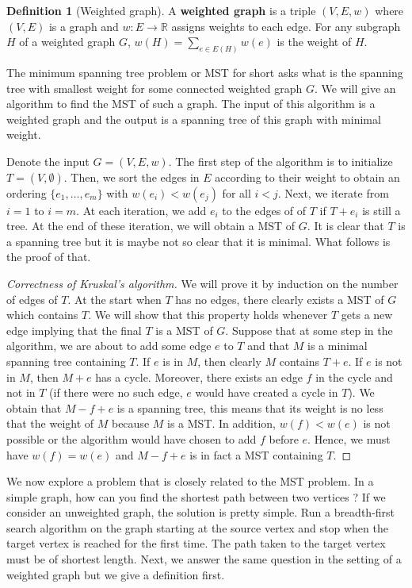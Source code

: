 \documentclass{tufte-handout}
\theoremstyle{definition}
\newtheorem{defn}[thm]{Definition}
\theoremstyle{remark}
\newcommand{\R}{\mathbb{R}}
\begin{document}
\begin{defn}[Weighted graph]
	A \textbf{weighted graph} is a triple $(V,E,w)$ where $(V,E)$ is a graph and $w: E \rightarrow \R$ assigns weights to each edge. For any subgraph $H$ of a weighted graph $G$, $w(H) = \sum_{e \in E(H)}w(e)$ is the weight of $H$.
\end{defn}
The minimum spanning tree problem or MST for short asks what is the spanning tree with smallest weight for some connected weighted graph $G$. We will give an algorithm to find the MST of such a graph. The input of this algorithm is a weighted graph and the output is a spanning tree of this graph with minimal weight.

Denote the input $G=(V,E,w)$. The first step of the algorithm is to initialize $T = (V,\emptyset)$. Then, we sort the edges in $E$ according to their weight to obtain an ordering $\{e_1, \dots, e_m\}$ with $w(e_i) < w(e_j)$ for all $i < j$. Next, we iterate from $i=1$ to $i=m$. At each iteration, we add $e_i$ to the edges of of $T$ if $T+e_i$ is still a tree. At the end of these iteration, we will obtain a MST of $G$. It is clear that $T$ is a spanning tree but it is maybe not so clear that it is minimal. What follows is the proof of that.

\begin{proof}[Correctness of Kruskal's algorithm]
	We will prove it by induction on the number of edges of $T$. At the start when $T$ has no edges, there clearly exists a MST of $G$ which contains $T$. We will show that this property holds whenever $T$ gets a new edge implying that the final $T$ is a MST of $G$. Suppose that at some step in the algorithm, we are about to add some edge $e$ to $T$ and that $M$ is a minimal spanning tree containing $T$. If $e$ is in $M$, then clearly $M$ contains $T+e$. If $e$ is not in $M$, then $M+e$ has a cycle. Moreover, there exists an edge $f$ in the cycle and not in $T$ (if there were no such edge, $e$ would have created a cycle in $T$). We obtain that $M-f+e$ is a spanning tree, this means that its weight is no less that the weight of $M$ because $M$ is a MST. In addition, $w(f) < w(e)$ is not possible or the algorithm would have chosen to add $f$ before $e$. Hence, we must have $w(f) = w(e)$ and $M-f+e$ is in fact a MST containing $T$.
\end{proof}

We now explore a problem that is closely related to the MST problem. In a simple graph, how can you find the shortest path between two vertices ? If we consider an unweighted graph, the solution is pretty simple. Run a breadth-first search algorithm on the graph starting at the source vertex and stop when the target vertex is reached for the first time. The path taken to the target vertex must be of shortest length. Next, we answer the same question in the setting of a weighted graph but we give a definition first.
\end{document}
